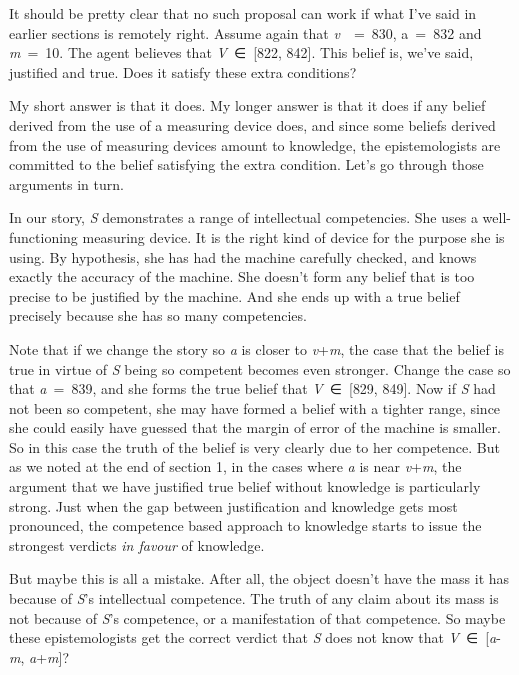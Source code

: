 \documentclass[
  10pt,
  letterpaper,
  DIV=11,
  numbers=noendperiod,
  twoside]{scrartcl}
\begin{document}
It should be pretty clear that no such proposal can work if what I've
said in earlier sections is remotely right. Assume again that
\emph{v}~~=~830, a~=~832 and \emph{m}~=~10. The agent believes that
\emph{V}~∈~{[}822, 842{]}. This belief is, we've said, justified and
true. Does it satisfy these extra conditions?

My short answer is that it does. My longer answer is that it does if any
belief derived from the use of a measuring device does, and since some
beliefs derived from the use of measuring devices amount to knowledge,
the epistemologists are committed to the belief satisfying the extra
condition. Let's go through those arguments in turn.

In our story, \emph{S} demonstrates a range of intellectual
competencies. She uses a well-functioning measuring device. It is the
right kind of device for the purpose she is using. By hypothesis, she
has had the machine carefully checked, and knows exactly the accuracy of
the machine. She doesn't form any belief that is too precise to be
justified by the machine. And she ends up with a true belief precisely
because she has so many competencies.

Note that if we change the story so \emph{a} is closer to
\emph{v}+\emph{m}, the case that the belief is true in virtue of
\emph{S} being so competent becomes even stronger. Change the case so
that \emph{a}~=~839, and she forms the true belief that
\emph{V}~∈~{[}829, 849{]}. Now if \emph{S} had not been so competent,
she may have formed a belief with a tighter range, since she could
easily have guessed that the margin of error of the machine is smaller.
So in this case the truth of the belief is very clearly due to her
competence. But as we noted at the end of section 1, in the cases where
\emph{a} is near \emph{v}+\emph{m}, the argument that we have justified
true belief without knowledge is particularly strong. Just when the gap
between justification and knowledge gets most pronounced, the competence
based approach to knowledge starts to issue the strongest verdicts
\emph{in favour} of knowledge.

But maybe this is all a mistake. After all, the object doesn't have the
mass it has because of \emph{S}'s intellectual competence. The truth of
any claim about its mass is not because of \emph{S}'s competence, or a
manifestation of that competence. So maybe these epistemologists get the
correct verdict that \emph{S} does not know that
\emph{V}~∈~{[}\emph{a}-\emph{m}, \emph{a}+\emph{m}{]}?
\end{document}
